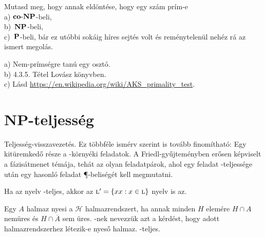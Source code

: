 \begin{Exercise}[counter={sorszam}, difficulty=0]
	Mutasd meg, hogy annak eld\"ont\'ese, hogy egy sz\'am pr\'im-e\\
	a) $\coNP$-beli,\\
	b)~\hard $\NP$-beli,\\
	c)~\veryhard $\P$-beli, b\'ar ez ut\'obbi sok\'aig h\'ires sejt\'es volt \'es rem\'enytelen\"ul neh\'ez r\'a az ismert megol\'as.
\end{Exercise}	
\begin{Answer}
	a) Nem-pr\'ims\'egre tan\'u egy oszt\'o.\\
	b) 4.3.5. Tétel Lov\'asz k\"onyvben.\\
	c) L\'asd \url{https://en.wikipedia.org/wiki/AKS_primality_test}.
\end{Answer}




\section{NP-teljess\'eg}

Teljesség-visszavezetés. Ez többféle ismérv szerint is tovább finomítható: Egy kitüremkedő része a \SAT-környéki feladatok. A Friedl-gyűjteményben erősen képviselt a fázisátmenet témája, tehát az olyan feladatpárok, ahol egy feladat \NP-teljessége után egy hasonló feladat \P-beliségét kell megmutatni.


\begin{Exercise}[counter={sorszam}, difficulty=-1]
	Ha az \Language nyelv \NP-teljes, akkor az $\Language' = \{ xx : x \in \Language \}$ nyelv is az.
\end{Exercise}



\begin{Exercise}[counter={sorszam}, difficulty=0]
	Egy $A$ halmaz nyesi a $\mathcal{H}$ halmazrendszert, ha annak
	minden $H$ elemére $H \cap A$ nemüres és $H \cap \overline{A}$ sem
	üres. -nek nevezzük azt a kérdést, hogy adott halmazrendszerhez
	létezik-e nyeső halmaz.  \NP-teljes. 
	
\end{Exercise}

